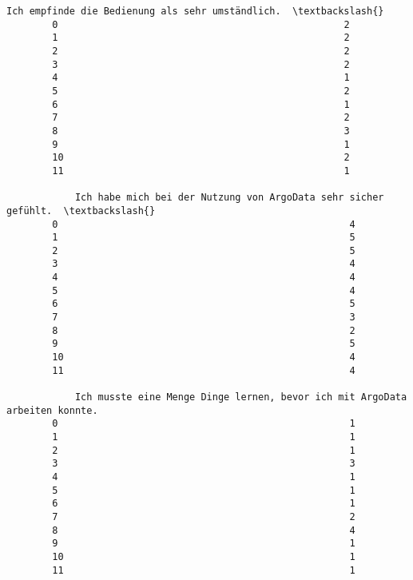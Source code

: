 \documentclass[11pt]{article}
\begin{document}
\begin{Verbatim}[commandchars=\\\{\}]
            Ich empfinde die Bedienung als sehr umständlich.  \textbackslash{}
        0                                                  2   
        1                                                  2   
        2                                                  2   
        3                                                  2   
        4                                                  1   
        5                                                  2   
        6                                                  1   
        7                                                  2   
        8                                                  3   
        9                                                  1   
        10                                                 2   
        11                                                 1   
        
            Ich habe mich bei der Nutzung von ArgoData sehr sicher gefühlt.  \textbackslash{}
        0                                                   4                 
        1                                                   5                 
        2                                                   5                 
        3                                                   4                 
        4                                                   4                 
        5                                                   4                 
        6                                                   5                 
        7                                                   3                 
        8                                                   2                 
        9                                                   5                 
        10                                                  4                 
        11                                                  4                 
        
            Ich musste eine Menge Dinge lernen, bevor ich mit ArgoData arbeiten konnte.  
        0                                                   1                            
        1                                                   1                            
        2                                                   1                            
        3                                                   3                            
        4                                                   1                            
        5                                                   1                            
        6                                                   1                            
        7                                                   2                            
        8                                                   4                            
        9                                                   1                            
        10                                                  1                            
        11                                                  1                            
\end{Verbatim}
            
\end{document}

